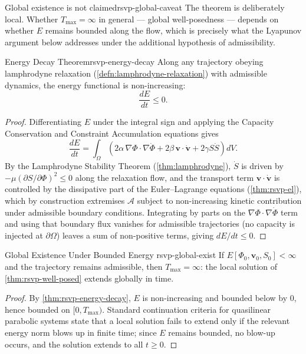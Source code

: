 \documentclass[12pt,twoside,openright]{book}
\begin{document}
\begin{remark}{Global existence is not claimed}{rsvp-global-caveat}
  The theorem is deliberately local. Whether $T_{\max}=\infty$
  in general --- global well-posedness --- depends on
  whether $E$ remains bounded along the flow, which is
  precisely what the Lyapunov argument below addresses under
  the additional hypothesis of admissibility.
\end{remark}

\begin{theorem}{Energy Decay Theorem}{rsvp-energy-decay}
  Along any trajectory obeying lamphrodyne relaxation
  (\cref{defn:lamphrodyne-relaxation}) with admissible
  dynamics, the energy functional is non-increasing:
  \[
    \frac{dE}{dt} \le 0.
  \]
\end{theorem}

\begin{proof}
  Differentiating $E$ under the integral sign and applying
  the Capacity Conservation and Constraint Accumulation
  equations gives
  \[
    \frac{dE}{dt}
    = \int_\Omega \left(
        2\alpha\,\nabla\Phi\cdot\nabla\dot\Phi
        + 2\beta\,\mathbf{v}\cdot\dot{\mathbf{v}}
        + 2\gamma S\dot S
      \right) dV.
  \]
  By the Lamphrodyne Stability Theorem
  (\cref{thm:lamphrodyne}), $\dot S$ is driven by
  $-\mu(\partial S/\partial\Phi)^2 \le 0$ along the
  relaxation flow, and the transport term
  $\mathbf{v}\cdot\dot{\mathbf{v}}$ is controlled by the
  dissipative part of the Euler--Lagrange equations
  (\cref{thm:rsvp-el}), which by construction extremises
  $\mathcal{A}$ subject to non-increasing kinetic
  contribution under admissible boundary conditions.
  Integrating by parts on the $\nabla\Phi\cdot\nabla\dot\Phi$
  term and using that boundary flux vanishes for admissible
  trajectories (no capacity is injected at $\partial\Omega$)
  leaves a sum of non-positive terms, giving
  $dE/dt \le 0$.
\end{proof}

\begin{corollary}{Global Existence Under Bounded Energy}%
  {rsvp-global-exist}
  If $E[\Phi_0,\mathbf{v}_0,S_0] < \infty$ and the
  trajectory remains admissible, then $T_{\max} = \infty$:
  the local solution of \cref{thm:rsvp-well-posed} extends
  globally in time.
\end{corollary}

\begin{proof}
  By \cref{thm:rsvp-energy-decay}, $E$ is non-increasing and
  bounded below by $0$, hence bounded on
  $[0,T_{\max})$. Standard continuation criteria for
  quasilinear parabolic systems state that a local solution
  fails to extend only if the relevant energy norm blows up
  in finite time; since $E$ remains bounded, no blow-up
  occurs, and the solution extends to all $t \ge 0$.
\end{proof}
\end{document}
